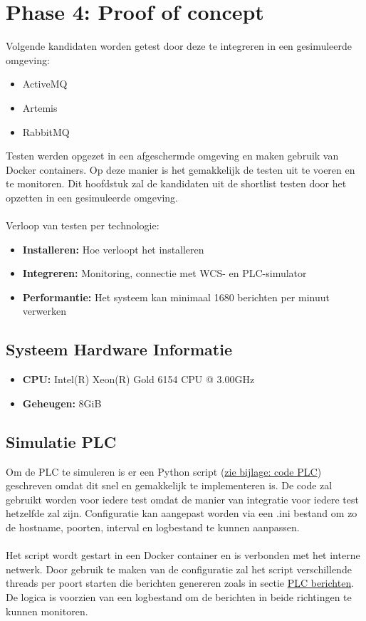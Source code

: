 \section{Phase 4: Proof of concept}
Volgende kandidaten worden getest door deze te integreren in een gesimuleerde omgeving:
\begin{itemize}
  \item ActiveMQ
  \item Artemis
  \item RabbitMQ
\end{itemize}

Testen werden opgezet in een afgeschermde omgeving en maken gebruik van Docker containers.
Op deze manier is het gemakkelijk de testen uit te voeren en te monitoren.
Dit hoofdstuk zal de kandidaten uit de shortlist testen door het opzetten in een gesimuleerde omgeving.
\\\\
Verloop van testen per technologie:
\begin{itemize}
  \item \textbf{Installeren:} Hoe verloopt het installeren
  \item \textbf{Integreren:} Monitoring, connectie met WCS- en PLC-simulator
  \item \textbf{Performantie:} Het systeem kan minimaal 1680 berichten per minuut verwerken
\end{itemize}

\subsection{Systeem Hardware Informatie}
\begin{itemize}
    \item \textbf{CPU:} Intel(R) Xeon(R) Gold 6154 CPU @ 3.00GHz
    \item \textbf{Geheugen:} 8GiB
\end{itemize}

\subsection{Simulatie PLC}
Om de PLC te simuleren is er een Python script (\hyperref[listing:code_plc]{zie bijlage: code PLC}) geschreven omdat dit snel en gemakkelijk te implementeren is.
De code zal gebruikt worden voor iedere test omdat de manier van integratie voor iedere test hetzelfde zal zijn.
Configuratie kan aangepast worden via een .ini bestand om zo de hostname, poorten, interval en logbestand te kunnen aanpassen.
\\\\
Het script wordt gestart in een Docker container en is verbonden met het interne netwerk.
Door gebruik te maken van de configuratie zal het script verschillende threads per poort starten die berichten genereren
zoals in sectie \hyperref[listing:message_example]{PLC berichten}.
De logica is voorzien van een logbestand om de berichten in beide richtingen te kunnen monitoren.

